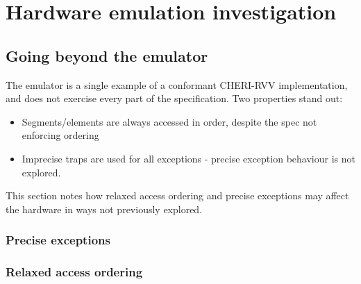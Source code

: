 \chapter{Hardware emulation investigation}




% 
% 

\section{Going beyond the emulator}
The emulator is a single example of a conformant CHERI-RVV implementation, and does not exercise every part of the specification.
Two properties stand out:
\begin{itemize}
    \item Segments/elements are always accessed in order, despite the spec not enforcing ordering
    \item Imprecise traps are used for all exceptions - precise exception behaviour is not explored.
\end{itemize}
This section notes how relaxed access ordering and precise exceptions may affect the hardware in ways not previously explored.

\subsection{Precise exceptions}

\subsection{Relaxed access ordering}

